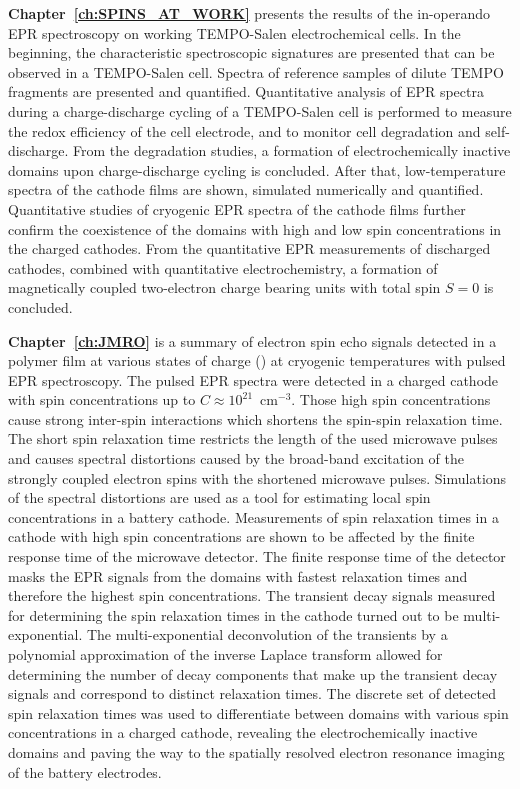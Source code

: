 \par
\textbf{Chapter~\ref{ch:SPINS_AT_WORK}} presents the results of the in-operando EPR spectroscopy on working TEMPO-Salen electrochemical cells. In the beginning, the characteristic spectroscopic signatures are presented that can be observed in a TEMPO-Salen cell. Spectra of reference samples of dilute TEMPO fragments are presented and quantified. Quantitative analysis of EPR spectra during a charge-discharge cycling of a TEMPO-Salen cell is performed to measure the redox efficiency of the cell electrode, and to monitor cell degradation and self-discharge. From the degradation studies, a formation of electrochemically inactive domains upon charge-discharge cycling is concluded. After that, low-temperature spectra of the cathode films are shown, simulated numerically and quantified. Quantitative studies of cryogenic EPR spectra of the cathode films further confirm the coexistence of the domains with high and low spin concentrations in the charged cathodes. From the quantitative EPR measurements of discharged cathodes, combined with quantitative electrochemistry, a formation of magnetically coupled two-electron charge bearing units with total spin $S=0$ is concluded.\\ 

\par
\textbf{Chapter~\ref{ch:JMRO}} is a summary of electron spin echo signals detected in a polymer  film at various states of charge () at cryogenic temperatures with pulsed EPR spectroscopy. The pulsed EPR spectra were detected in a charged cathode with spin concentrations up to $C\approx10^{21}$~cm$^{-3}$. Those high spin concentrations cause strong inter-spin interactions which shortens the spin-spin relaxation time. The short spin relaxation time restricts the length of the used microwave pulses and causes spectral distortions caused by the broad-band excitation of the strongly coupled electron spins with the shortened microwave pulses. Simulations of the spectral distortions are used as a tool for estimating local spin concentrations in a battery cathode. Measurements of spin relaxation times in a cathode with high spin concentrations are shown to be affected by the finite response time of the microwave detector. The finite response time of the detector masks the EPR signals from the domains with fastest relaxation times and therefore the highest spin concentrations. The transient decay signals measured for determining the spin relaxation times in the cathode turned out to be multi-exponential. The multi-exponential deconvolution of the transients by a polynomial approximation of the inverse Laplace transform allowed for determining the number of decay components that make up the transient decay signals and correspond to distinct relaxation times. The discrete set of detected spin relaxation times was used to differentiate between domains with various spin concentrations in a charged cathode, revealing the electrochemically inactive domains and paving the way to the spatially resolved electron resonance imaging of the battery electrodes.\\

